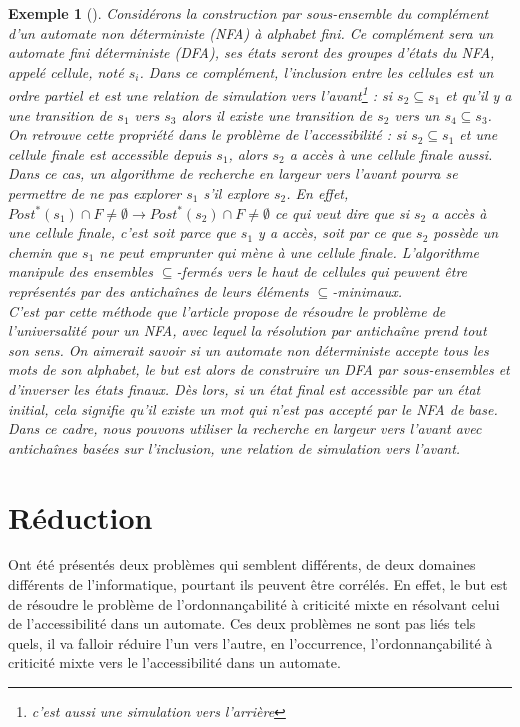 \documentclass[12pt,a4paper,oneside]{book}
\theoremstyle{break}
\newtheorem{exem}{Exemple}[chapter]
\theoremstyle{breakplain}
\begin{document}
\begin{exem}[\cite{doyen2010antichain}]
Considérons la construction par sous-ensemble du complément d'un automate non déterministe (NFA) à alphabet fini. Ce complément sera un automate fini déterministe (DFA), ses états seront des groupes d'états du NFA, appelé cellule, noté $s_i$. Dans ce complément, l'inclusion entre les cellules est un ordre partiel et est une relation de simulation vers l'avant\footnote{c'est aussi une simulation vers l'arrière} : si $s_2 \subseteq s_1$ et qu'il y a une transition de $s_1$ vers $s_3$ alors il existe une transition de $s_2$ vers un $s_4 \subseteq s_3$. On retrouve cette propriété dans le problème de l'accessibilité : si $s_2 \subseteq s_1$ et une cellule finale est accessible depuis $s_1$, alors $s_2$ a accès à une cellule finale aussi. Dans ce cas, un algorithme de recherche en largeur vers l'avant pourra se permettre de ne pas explorer $s_1$ s'il explore $s_2$. En effet, $Post^*(s_1) \cap F \neq \emptyset \rightarrow Post^*(s_2) \cap F \neq \emptyset$ ce qui veut dire que si $s_2$ a accès à une cellule finale, c'est soit parce que $s_1$ y a accès, soit par ce que $s_2$ possède un chemin que $s_1$ ne peut emprunter qui mène à une cellule finale. L'algorithme manipule des ensembles $\subseteq$-fermés vers le haut de cellules qui peuvent être représentés par des antichaînes de leurs éléments $\subseteq$-minimaux.\\

C'est par cette méthode que l'article \cite{doyen2010antichain} propose de résoudre le problème de l'universalité pour un NFA, avec lequel la résolution par antichaîne prend tout son sens. On aimerait savoir si un automate non déterministe accepte tous les mots de son alphabet, le but est alors de construire un DFA par sous-ensembles et d'inverser les états finaux. Dès lors, si un état final est accessible par un état initial, cela signifie qu'il existe un mot qui n'est pas accepté par le NFA de base. Dans ce cadre, nous pouvons utiliser la recherche en largeur vers l’avant avec antichaînes basées sur l'inclusion, une relation de simulation vers l'avant.
\end{exem}

\section{Réduction}
Ont été présentés deux problèmes qui semblent différents, de deux domaines différents de l'informatique, pourtant ils peuvent être corrélés. En effet, le but est de résoudre le problème de l'ordonnançabilité à criticité mixte en résolvant celui de l'accessibilité dans un automate. Ces deux problèmes ne sont pas liés tels quels, il va falloir réduire l'un vers l'autre, en l'occurrence, l'ordonnançabilité à criticité mixte vers le l'accessibilité dans un automate.\\
\end{document}
